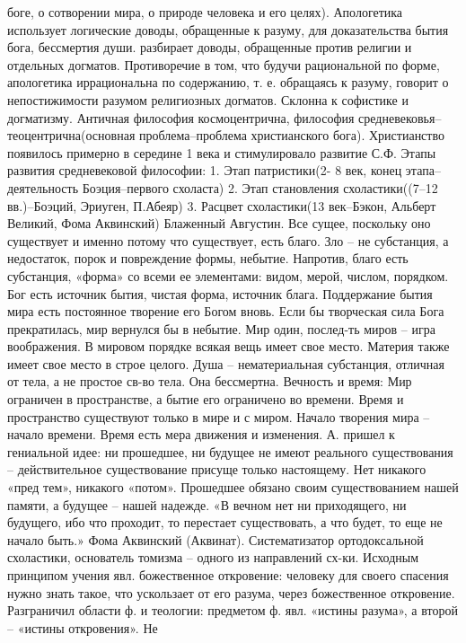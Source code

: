 \documentclass[12pt]{article}
\begin{document}
боге,  о  сотворении  мира,  о  природе  человека  и  его  целях).  Апологетика  использует  логические  доводы,
обращенные к разуму, для доказательства бытия бога, бессмертия души. разбирает доводы, обращенные против
религии  и  отдельных  догматов.  Противоречие  в  том,  что  будучи  рациональной  по  форме,  апологетика
иррациональна по содержанию, т. е. обращаясь к разуму, говорит о непостижимости разумом религиозных
догматов.
Склонна к софистике и догматизму.
Античная философия космоцентрична, философия средневековья–теоцентрична(основная проблема–проблема
христианского бога). Христианство появилось примерно в середине 1 века и стимулировало развитие С.Ф.
Этапы развития средневековой философии:
1. Этап патристики(2- 8 век, конец этапа–деятельность Боэция–первого схоласта)
2. Этап становления схоластики((7–12 вв.)–Боэций, Эриуген, П.Абеяр)
3. Расцвет схоластики(13 век–Бэкон, Альберт Великий, Фома Аквинский)
Блаженный Августин. Все сущее, поскольку оно существует и именно потому что существует, есть благо. Зло –
не субстанция, а недостаток, порок и повреждение формы, небытие. Напротив, благо есть субстанция, «форма»
со всеми ее элементами: видом, мерой, числом, порядком. Бог есть источник бытия, чистая форма, источник
блага. Поддержание бытия мира есть постоянное творение его Богом вновь. Если бы творческая сила Бога
прекратилась, мир вернулся бы в небытие. Мир один, послед-ть миров – игра воображения. В мировом порядке
всякая вещь имеет свое место. Материя также имеет свое место в строе целого.
Душа – нематериальная субстанция, отличная от тела, а не простое св-во тела. Она бессмертна.
Вечность и время: Мир ограничен в пространстве, а бытие его ограничено во времени. Время и пространство
существуют только в мире и с миром. Начало творения мира – начало времени. Время есть мера движения и
изменения. А. пришел к гениальной идее: ни прошедшее, ни будущее не имеют реального существования –
действительное  существование  присуще  только  настоящему.  Нет  никакого  «пред  тем»,  никакого  «потом».
Прошедшее обязано своим существованием нашей памяти, а будущее – нашей надежде. «В вечном нет ни
приходящего, ни будущего, ибо что проходит, то перестает существовать, а что будет, то еще не начало быть.»
Фома  Аквинский  (Аквинат).  Систематизатор  ортодоксальной  схоластики,  основатель  томизма  –  одного  из
направлений сх-ки. Исходным принципом учения явл. божественное откровение: человеку для своего спасения
нужно знать такое, что ускользает от его разума, через божественное откровение.
Разграничил области ф. и теологии: предметом ф. явл. «истины разума», а второй – «истины откровения». Не
\end{document}
